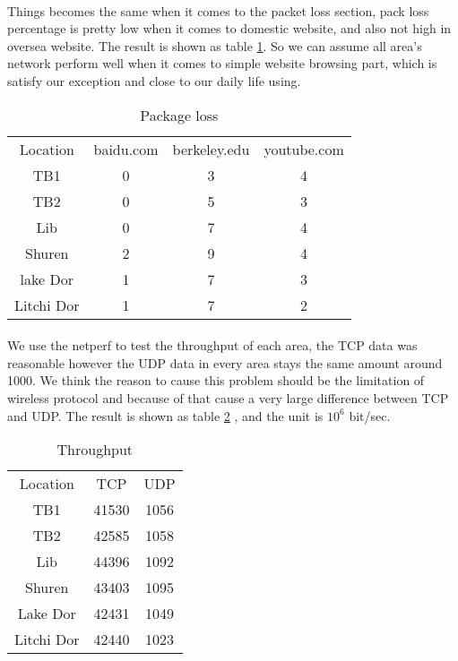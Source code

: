 \documentclass[paper=a4, fontsize=11pt]{scrartcl}
\numberwithin{equation}{section}
\numberwithin{figure}{section}
\numberwithin{table}{section}
\begin{document}
\paragraph{}
Things becomes the same when it comes to the packet loss section, pack loss percentage is pretty low when it comes to domestic website, and also not high in oversea website. The result is shown as table \ref{tab:c3}. So we can assume all area's network perform well when it comes to simple website browsing part, which is satisfy our exception and close to our daily life using.
\begin{table}[htbp]
  \centering
  \caption{Package loss}
    \begin{tabular}{cccc}
    Location    & \multicolumn{1}{l}{baidu.com} & \multicolumn{1}{l}{berkeley.edu} & \multicolumn{1}{l}{youtube.com} \\
    TB1   & 0     & 3     & 4 \\
    TB2   & 0     & 5     & 3 \\
    Lib   & 0     & 7     & 4 \\
    Shuren & 2     & 9     & 4 \\
    lake Dor & 1     & 7     & 3 \\
    Litchi Dor  & 1     & 7     & 2 \\
    \end{tabular}%
  \label{tab:c3}%
\end{table}%
\paragraph{}
We use the netperf to test the throughput of each area, the TCP data was reasonable however the UDP data in every area stays the same amount around 1000. We think the reason to cause this problem should be the limitation of wireless protocol and because of that cause a very large difference between TCP and UDP. The result is shown as table \ref{tab:c4} , and the unit is $10^{6}$ bit/sec. 
\begin{table}[htbp]
  \centering
  \caption{Throughput}
    \begin{tabular}{ccc}
   Location & TCP   & UDP \\
    TB1   & 41530 & 1056 \\
    TB2   & 42585 & 1058 \\
    Lib   & 44396 & 1092 \\
    Shuren & 43403 & 1095 \\
    Lake Dor & 42431 & 1049 \\
    Litchi Dor & 42440 & 1023 \\
    \end{tabular}%
  \label{tab:c4}%
\end{table}%
\end{document}
